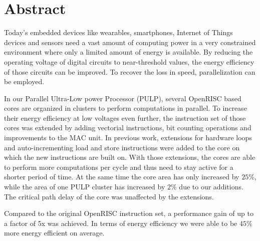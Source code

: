 
\chapter*{Abstract}
Today's embedded devices like wearables, smartphones, Internet of Things
devices and sensors need a vast amount of computing power in a very constrained
environment where only a limited amount of energy is available.
By reducing the operating voltage of digital circuits to near-threshold values,
the energy efficiency of those circuits can be improved. To recover the loss in
speed, parallelization can be employed.

In our Parallel Ultra-Low power Processor (PULP), several OpenRISC based cores
are organized in clusters to perform computations in parallel. To increase
their energy efficiency at low voltages even further, the instruction set of
those cores was extended by adding vectorial instructions, bit counting
operations and improvements to the MAC unit. In previous work, extensions for
hardware loops and auto-incrementing load and store instructions were added to
the core on which the new instructions are built on. With those extensions, the
cores are able to perform more computations per cycle and thus need to stay
active for a shorter period of time. At the same time the core area has only
increased by $25\%$, while the area of one PULP cluster has increased by $2\%$
due to our additions.
The critical path delay of the core was unaffected by the extensions.

Compared to the original OpenRISC instruction set, a performance gain of up to
a factor of 5x was achieved. In terms of energy efficiency we were able to be
$45\%$ more energy efficient on average.

